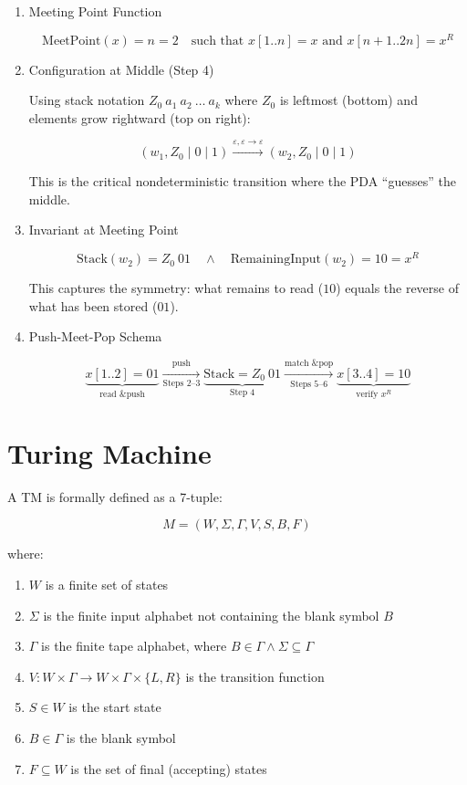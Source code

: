 \documentclass[12pt,a4paper,openany]{article}
\begin{document}
\begin{enumerate}
\begin{enumerate}
\item Meeting Point Function

\[
\text{MeetPoint}(x) = n = 2 \quad \text{such that } x[1..n] = x \text{ and } x[n+1..2n] = x^R
\]

\item Configuration at Middle (Step 4)

Using stack notation $Z_0\ a_1\ a_2\ \ldots\ a_k$ where $Z_0$ is leftmost (bottom) and elements grow rightward (top on right):

\[
(w_1, Z_0 \mid 0 \mid 1) \xrightarrow{\varepsilon, \varepsilon \to \varepsilon} (w_2, Z_0 \mid 0 \mid 1)
\]

This is the critical nondeterministic transition where the PDA ``guesses'' the middle.

\item Invariant at Meeting Point

\[
\boxed{\text{Stack}(w_2) = Z_0\ 01 \quad \land \quad \text{RemainingInput}(w_2) = 10 = x^R}
\]

This captures the symmetry: what remains to read ($10$) equals the reverse of what has been stored ($01$).

\item Push-Meet-Pop Schema

\[
\underbrace{x[1..2] = 01}_{\text{read \& push}}
\xrightarrow[\text{Steps 2--3}]{\text{push}}
\underbrace{\text{Stack} = Z_0\ 01}_{\text{Step 4}}
\xrightarrow[\text{Steps 5--6}]{\text{match \& pop}}
\underbrace{x[3..4] = 10}_{\text{verify } x^R}
\]

\end{enumerate}

\end{enumerate}

\section{Turing Machine}

A TM is formally defined as a 7-tuple:

\[
M = (W, \Sigma, \Gamma, V, S, B, F)
\]

where:

\begin{enumerate}
    \item $W$ is a finite set of states
    \item $\Sigma$ is the finite input alphabet not containing the blank symbol $B$
    \item $\Gamma$ is the finite tape alphabet, where $B \in \Gamma \land \Sigma \subseteq \Gamma$
    \item $V: W \times \Gamma \to W \times \Gamma \times \{L, R\}$ is the transition function
    \item $S \in W$ is the start state
    \item $B \in \Gamma$ is the blank symbol
    \item $F \subseteq W$ is the set of final (accepting) states
\end{enumerate}
\end{document}
